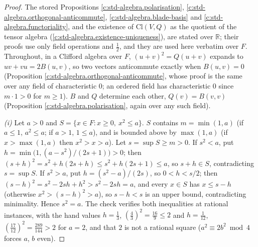 \documentclass[11pt]{article}
\theoremstyle{definition}
\theoremstyle{plain}
\providecommand{\Cl}{}\renewcommand{\Cl}{\mathrm{Cl}}
\providecommand{\R}{}\renewcommand{\R}{\mathbb{R}}
\begin{document}
\begin{proof}
The stored Propositions \ref{c:std-algebra.polarisation}, \ref{c:std-algebra.orthogonal-anticommute}, \ref{c:std-algebra.blade-basis} and \ref{c:std-algebra.functoriality}, and the existence of $\Cl(V, Q)$ as the quotient of the tensor algebra (\ref{c:std-algebra.existence-uniqueness}), are stated over $\R$; their proofs use only field operations and $\tfrac12$, and they are used here verbatim over $F$. Throughout, in a Clifford algebra over $F$, $(u + v)^{2} = Q(u + v)$ expands to $uv + vu = 2B(u, v)$, so two vectors anticommute exactly when $B(u, v) = 0$ (Proposition \ref{c:std-algebra.orthogonal-anticommute}, whose proof is the same over any field of characteristic $0$; an ordered field has characteristic $0$ since $m \cdot 1 > 0$ for $m \ge 1$). $B$ and $Q$ determine each other, $Q(v) = B(v, v)$ (Proposition \ref{c:std-algebra.polarisation}, again over any such field).

\emph{(i)} Let $a > 0$ and $S = \{x \in F : x \ge 0,\ x^{2} \le a\}$. $S$ contains $m = \min(1, a)$ (if $a \le 1$, $a^{2} \le a$; if $a > 1$, $1 \le a$), and is bounded above by $\max(1, a)$ (if $x > \max(1, a)$ then $x^{2} > x > a$). Let $s = \sup S \ge m > 0$. If $s^{2} < a$, put $h = \min\bigl(1, (a - s^{2})/(2s + 1)\bigr) > 0$; then $(s + h)^{2} = s^{2} + h(2s + h) \le s^{2} + h(2s + 1) \le a$, so $s + h \in S$, contradicting $s = \sup S$. If $s^{2} > a$, put $h = (s^{2} - a)/(2s)$, so $0 < h < s/2$; then $(s - h)^{2} = s^{2} - 2sh + h^{2} > s^{2} - 2sh = a$, and every $x \in S$ has $x \le s - h$ (otherwise $x^{2} > (s - h)^{2} > a$), so $s - h < s$ is an upper bound, contradicting minimality. Hence $s^{2} = a$. The check verifies both inequalities at rational instances, with the hand values $h = \tfrac13$, $(\tfrac43)^{2} = \tfrac{16}{9} \le 2$ and $h = \tfrac1{12}$, $(\tfrac{17}{12})^{2} = \tfrac{289}{144} > 2$ for $a = 2$, and that $2$ is not a rational square ($a^{2} \equiv 2b^{2} \bmod 4$ forces $a$, $b$ even).


\end{proof}
\end{document}
